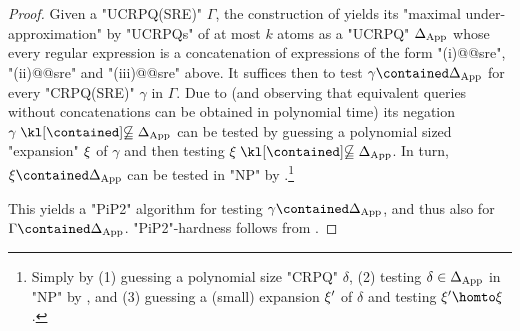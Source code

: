 \begin{proof}
	Given a "UCRPQ(SRE)" $\Gamma$, the construction of  yields its "maximal under-approximation" by "UCRPQs" of at most $k$ atoms as a "UCRPQ" $\Delta_{\textnormal{App}}$ whose every regular expression is a concatenation of expressions of the form "(i)@@sre", "(ii)@@sre" and "(iii)@@sre" above.
	It suffices then to test $\gamma \contained \Delta_{\textnormal{App}}$ for every "CRPQ(SRE)" $\gamma$ in $\Gamma$. Due to 
	(and observing that equivalent queries without concatenations can be obtained in polynomial time)
	its negation $\gamma \notcontained \Delta_{\textnormal{App}}$ can be tested by guessing a polynomial sized "expansion" $\xi$ of $\gamma$ and then testing $\anexpansion \notcontained \Delta_{\textnormal{App}}$.
	In turn, $\anexpansion \contained \Delta_{\textnormal{App}}$ can be tested in "NP" by 
	\cite[Theorem 4.2]{FigueiraEtal2020Containment}.\footnote{Simply by (1) guessing a polynomial size "CRPQ" $\delta$, (2) testing $\delta \in \Delta_{\textnormal{App}}$ in "NP" by , and (3) guessing a (small) expansion $\xi'$ of $\delta$ and testing $\anexpansion' \homto \anexpansion$.}

	This yields a "PiP2" algorithm for testing $\gamma \contained \Delta_{\textnormal{App}}$, and thus also for $\Gamma \contained \Delta_{\textnormal{App}}$.
	"PiP2"-hardness follows from .
\end{proof}

